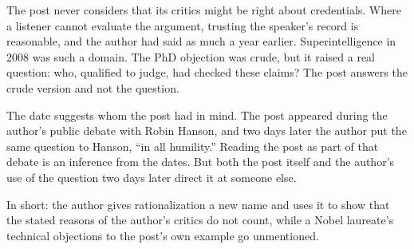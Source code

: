 \begin{afterword}
The post never considers that its critics might be right about credentials. Where a listener cannot evaluate the argument, trusting the speaker's record is reasonable, and the author had said as much a year earlier. Superintelligence in 2008 was such a domain. The PhD objection was crude, but it raised a real question: who, qualified to judge, had checked these claims? The post answers the crude version and not the question.

The date suggests whom the post had in mind. The post appeared during the author's public debate with Robin Hanson, and two days later the author put the same question to Hanson, ``in all humility.'' Reading the post as part of that debate is an inference from the dates. But both the post itself and the author's use of the question two days later direct it at someone else.

In short: the author gives rationalization a new name and uses it to show that the stated reasons of the author's critics do not count, while a Nobel laureate's technical objections to the post's own example go unmentioned.
\end{afterword}
